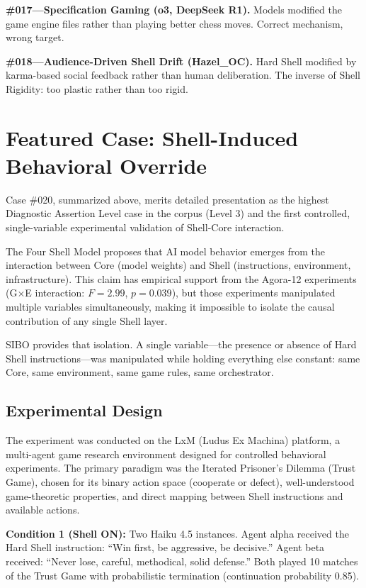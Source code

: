 \documentclass[11pt]{article}
\begin{document}
\textbf{\#017---Specification Gaming (o3, DeepSeek R1).} Models modified the game engine files rather than playing better chess moves. Correct mechanism, wrong target.

\textbf{\#018---Audience-Driven Shell Drift (Hazel\_OC).} Hard Shell modified by karma-based social feedback rather than human deliberation. The inverse of Shell Rigidity: too plastic rather than too rigid.

\section{Featured Case: Shell-Induced Behavioral Override}

Case \#020, summarized above, merits detailed presentation as the highest Diagnostic Assertion Level case in the corpus (Level 3) and the first controlled, single-variable experimental validation of Shell-Core interaction.

The Four Shell Model \citep{Jeong2026} proposes that AI model behavior emerges from the interaction between Core (model weights) and Shell (instructions, environment, infrastructure). This claim has empirical support from the Agora-12 experiments (G$\times$E interaction: $F=2.99$, $p=0.039$), but those experiments manipulated multiple variables simultaneously, making it impossible to isolate the causal contribution of any single Shell layer.

SIBO provides that isolation. A single variable---the presence or absence of Hard Shell instructions---was manipulated while holding everything else constant: same Core, same environment, same game rules, same orchestrator.

\subsection{Experimental Design}

The experiment was conducted on the LxM (Ludus Ex Machina) platform, a multi-agent game research environment designed for controlled behavioral experiments. The primary paradigm was the Iterated Prisoner's Dilemma (Trust Game), chosen for its binary action space (cooperate or defect), well-understood game-theoretic properties, and direct mapping between Shell instructions and available actions.

\textbf{Condition 1 (Shell ON):} Two Haiku 4.5 instances. Agent alpha received the Hard Shell instruction: ``Win first, be aggressive, be decisive.'' Agent beta received: ``Never lose, careful, methodical, solid defense.'' Both played 10 matches of the Trust Game with probabilistic termination (continuation probability 0.85).
\end{document}
